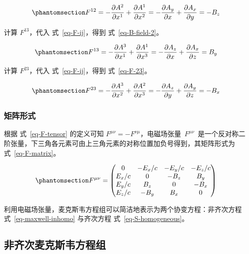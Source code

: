 \documentclass[
  chinese,
  a4paper,
  UTF8,
  12pt,
  oneside,
  openany]{ctexbook}
\theoremstyle{plain}
\theoremstyle{plain}
\theoremstyle{plain}
\theoremstyle{definition}
\theoremstyle{plain}
\theoremstyle{plain}
\theoremstyle{remark}
\begin{document}
\begin{equation}\protect\phantomsection\label{eq-B-field-1}{
F^{12} = -\frac{\partial A^2}{\partial x^{1}} + \frac{\partial A^1}{\partial x^{2}}
 = -\frac{\partial A_{y}}{\partial x} + \frac{\partial A_{x}}{\partial y}
 = -B_z
}\end{equation}

计算 \(F^{13}\)，代入 式~\ref{eq-F-ij}，得到 式~\ref{eq-B-field-2}。

\begin{equation}\protect\phantomsection\label{eq-B-field-2}{
F^{13} = -\frac{\partial A^3}{\partial x^{1}} + \frac{\partial A^1}{\partial x^{3}}
 = -\frac{\partial A_{z}}{\partial x} + \frac{\partial A_{x}}{\partial z}
 = B_y
}\end{equation}

计算 \(F^{23}\)，代入 式~\ref{eq-F-ij}，得到 式~\ref{eq-F-23}。

\begin{equation}\protect\phantomsection\label{eq-F-23}{
F^{23} = -\frac{\partial A^3}{\partial x^{2}} + \frac{\partial A^2}{\partial x^{3}}
 = -\frac{\partial A_{z}}{\partial y} + \frac{\partial A_{y}}{\partial z}
 = -B_x
}\end{equation}

\subsubsection{矩阵形式}\label{ux77e9ux9635ux5f62ux5f0f}

根据 式~\ref{eq-F-tensor} 的定义可知
\(F^{\mu\nu} = - F^{\nu\mu}\)，电磁场张量~\(F^{\mu\nu}\)~是一个反对称二阶张量，下三角各元素可由上三角元素的对称位置加负号得到，其矩阵形式为
式~\ref{eq-F-matrix}。

\begin{equation}\protect\phantomsection\label{eq-F-matrix}{
F^{\mu\nu} = \begin{pmatrix}
0 & - E_x/c & - E_y/c & - E_z/c \\
E_x/c & 0 & -B_z & B_y \\
E_y/c & B_z & 0 & -B_x \\
E_z/c & -B_y & B_x & 0
\end{pmatrix}
}\end{equation}

利用电磁场张量，麦克斯韦方程组可以简洁地表示为两个协变方程：非齐次方程
式~\ref{eq-maxwell-inhomo} 与齐次方程 式~\ref{eq-S-homogeneous}。

\subsection{非齐次麦克斯韦方程组}\label{ux975eux9f50ux6b21ux9ea6ux514bux65afux97e6ux65b9ux7a0bux7ec4}
\end{document}
